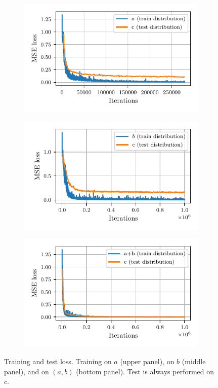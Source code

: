 \documentclass{ifacconf}
\begin{document}
\begin{figure}[h]
    \begin{subfigure}{\linewidth}
    \includegraphics[width=\linewidth]{img/shift/loss_shift_A}
    \end{subfigure}
    \begin{subfigure}{\linewidth}
    \includegraphics[width=\linewidth]{img/shift/loss_shift_B}
    \end{subfigure}
    \begin{subfigure}{\linewidth}
    \includegraphics[width=\linewidth]{img/shift/loss_shift_AB}
    \end{subfigure}
\caption{Training and test loss. Training on $a$ (upper panel), on $b$ (middle panel), and on $(a, b)$ (bottom panel). Test is always performed on $c$.}
\label{fig:distribution_shift}
\end{figure}
\end{document}
